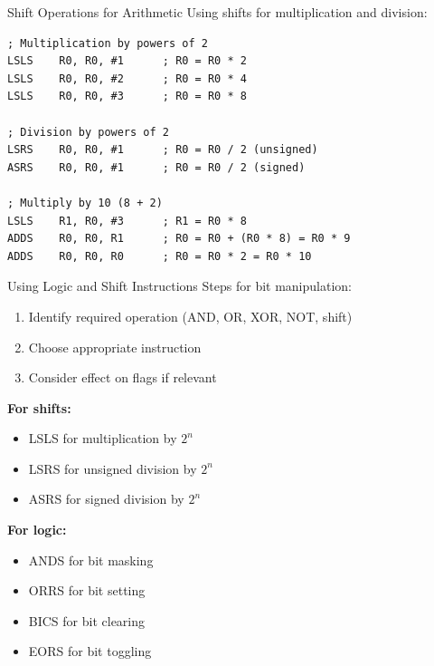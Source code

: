 \begin{example2}{Shift Operations for Arithmetic}
Using shifts for multiplication and division:
\begin{lstlisting}[language=armasm, style=basesmol]
; Multiplication by powers of 2
LSLS    R0, R0, #1      ; R0 = R0 * 2
LSLS    R0, R0, #2      ; R0 = R0 * 4
LSLS    R0, R0, #3      ; R0 = R0 * 8

; Division by powers of 2
LSRS    R0, R0, #1      ; R0 = R0 / 2 (unsigned)
ASRS    R0, R0, #1      ; R0 = R0 / 2 (signed)

; Multiply by 10 (8 + 2)
LSLS    R1, R0, #3      ; R1 = R0 * 8
ADDS    R0, R0, R1      ; R0 = R0 + (R0 * 8) = R0 * 9
ADDS    R0, R0, R0      ; R0 = R0 * 2 = R0 * 10
\end{lstlisting}
\end{example2}



\begin{KR}{Using Logic and Shift Instructions}
Steps for bit manipulation:
\begin{enumerate}
  \item Identify required operation (AND, OR, XOR, NOT, shift)
  \item Choose appropriate instruction
  \item Consider effect on flags if relevant
\end{enumerate}

\begin{minipage}[t]{0.55\textwidth}
  \textbf{For shifts:}
    \begin{itemize}
      \item LSLS for multiplication by $2^n$
      \item LSRS for unsigned division by $2^n$
      \item ASRS for signed division by $2^n$
    \end{itemize}
\end{minipage}
\begin{minipage}[t]{0.4\textwidth}
  \textbf{For logic:}
    \begin{itemize}
      \item ANDS for bit masking
      \item ORRS for bit setting
      \item BICS for bit clearing
      \item EORS for bit toggling
    \end{itemize}
\end{minipage}
\end{KR}

